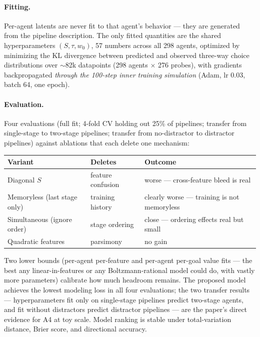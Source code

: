 \documentclass[11pt]{article}
\begin{document}
\paragraph{Fitting.} Per-agent latents are never fit to that agent's behavior --- they are generated from the pipeline description. The only fitted quantities are the shared hyperparameters $(S, \tau, w_0)$, 57 numbers across all 298 agents, optimized by minimizing the KL divergence between predicted and observed three-way choice distributions over $\sim$82k datapoints (298 agents $\times$ 276 probes), with gradients backpropagated \emph{through the 100-step inner training simulation} (Adam, lr 0.03, batch 64, one epoch).

\paragraph{Evaluation.} Four evaluations (full fit; 4-fold CV holding out 25\% of pipelines; transfer from single-stage to two-stage pipelines; transfer from no-distractor to distractor pipelines) against ablations that each delete one mechanism:

\begin{center}
\begin{tabular}{lll}
\toprule
Variant & Deletes & Outcome \\
\midrule
Diagonal $S$ & feature confusion & worse --- cross-feature bleed is real \\
Memoryless (last stage only) & training history & clearly worse --- training is not memoryless \\
Simultaneous (ignore order) & stage ordering & close --- ordering effects real but small \\
Quadratic features & parsimony & no gain \\
\bottomrule
\end{tabular}
\end{center}

Two lower bounds (per-agent per-feature and per-agent per-goal value fits --- the best any linear-in-features or any Boltzmann-rational model could do, with vastly more parameters) calibrate how much headroom remains. The proposed model achieves the lowest modeling loss in all four evaluations; the two transfer results --- hyperparameters fit only on single-stage pipelines predict two-stage agents, and fit without distractors predict distractor pipelines --- are the paper's direct evidence for A4 at toy scale. Model ranking is stable under total-variation distance, Brier score, and directional accuracy.
\end{document}
